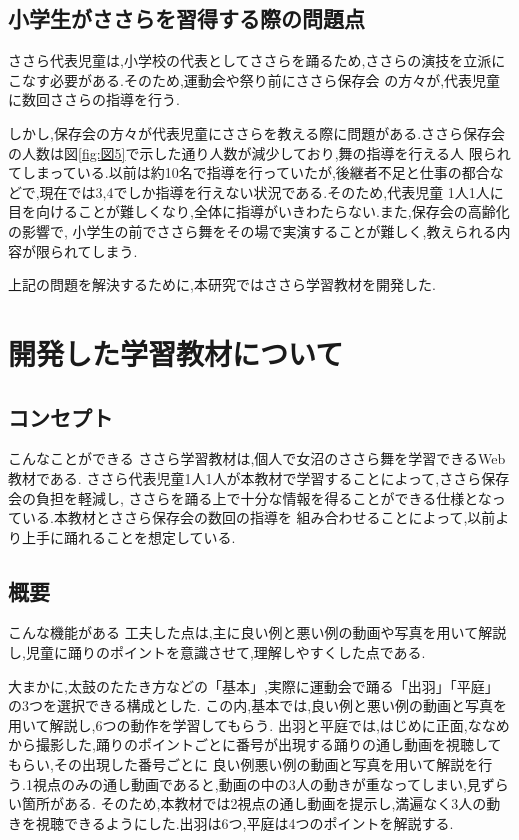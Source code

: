 \documentclass[12pt]{ltjsarticle}
\begin{document}
\subsection{小学生がささらを習得する際の問題点}
ささら代表児童は,小学校の代表としてささらを踊るため,ささらの演技を立派にこなす必要がある.そのため,運動会や祭り前にささら保存会
の方々が,代表児童に数回ささらの指導を行う.

しかし,保存会の方々が代表児童にささらを教える際に問題がある.ささら保存会の人数は図\ref{fig:図5}で示した通り人数が減少しており,舞の指導を行える人
限られてしまっている.以前は約10名で指導を行っていたが,後継者不足と仕事の都合などで,現在では3,4でしか指導を行えない状況である.そのため,代表児童
1人1人に目を向けることが難しくなり,全体に指導がいきわたらない.また,保存会の高齢化の影響で,
小学生の前でささら舞をその場で実演することが難しく,教えられる内容が限られてしまう.

上記の問題を解決するために,本研究ではささら学習教材を開発した.
\newpage
\section{開発した学習教材について}
\subsection{コンセプト}
こんなことができる
ささら学習教材は,個人で女沼のささら舞を学習できるWeb教材である.
ささら代表児童1人1人が本教材で学習することによって,ささら保存会の負担を軽減し,
ささらを踊る上で十分な情報を得ることができる仕様となっている.本教材とささら保存会の数回の指導を
組み合わせることによって,以前より上手に踊れることを想定している.

\subsection{概要}
こんな機能がある
工夫した点は,主に良い例と悪い例の動画や写真を用いて解説し,児童に踊りのポイントを意識させて,理解しやすくした点である.

大まかに,太鼓のたたき方などの「基本」,実際に運動会で踊る「出羽」「平庭」の3つを選択できる構成とした.
この内,基本では,良い例と悪い例の動画と写真を用いて解説し,6つの動作を学習してもらう.
出羽と平庭では,はじめに正面,ななめから撮影した,踊りのポイントごとに番号が出現する踊りの通し動画を視聴してもらい,その出現した番号ごとに
良い例悪い例の動画と写真を用いて解説を行う.1視点のみの通し動画であると,動画の中の3人の動きが重なってしまい,見ずらい箇所がある.
そのため,本教材では2視点の通し動画を提示し,満遍なく3人の動きを視聴できるようにした.出羽は6つ,平庭は4つのポイントを解説する.
\end{document}
